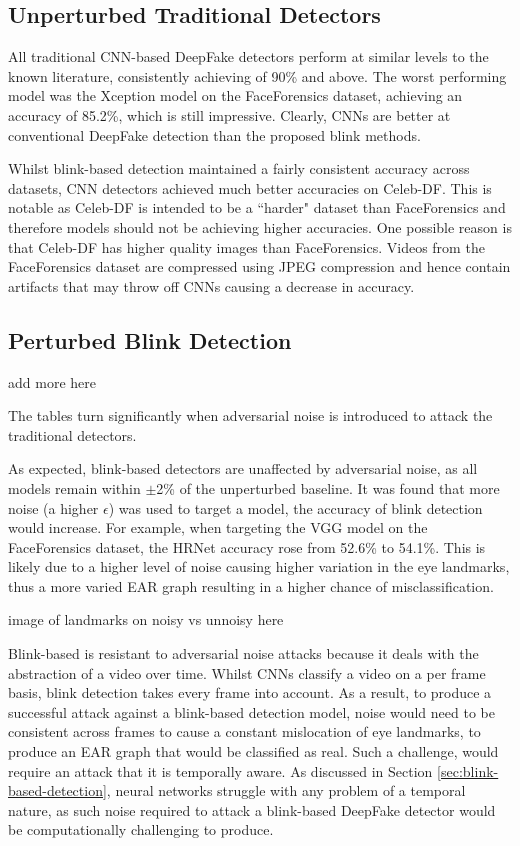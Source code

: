 \subsection{Unperturbed Traditional Detectors}
\label{sec:un-trad-detect}

All traditional CNN-based DeepFake detectors perform at similar levels to the known literature, consistently achieving of 90\% and above. The worst performing model was the Xception model on the FaceForensics dataset, achieving an accuracy of 85.2\%, which is still impressive. Clearly, CNNs are better at conventional DeepFake detection than the proposed blink methods. 

Whilst blink-based detection maintained a fairly consistent accuracy across datasets, CNN detectors achieved much better accuracies on Celeb-DF. This is notable as Celeb-DF is intended to be a ``harder" dataset than FaceForensics\cite{li2020celeb} and therefore models should not be achieving higher accuracies. One possible reason is that Celeb-DF has higher quality images than FaceForensics. Videos from the FaceForensics dataset are compressed using JPEG compression\cite{roessler2018faceforensics} and hence contain artifacts that may throw off CNNs causing a decrease in accuracy.

\subsection{Perturbed Blink Detection}
\label{sec:pert-blink}

{\huge add more here}

The tables turn significantly when adversarial noise is introduced to attack the traditional detectors. 

As expected, blink-based detectors are unaffected by adversarial noise, as all models remain within $\pm$2\% of the unperturbed baseline. It was found that more noise (a higher $\epsilon$) was used to target a model, the accuracy of blink detection would increase. For example, when targeting the VGG model on the FaceForensics dataset, the HRNet accuracy rose from 52.6\% to 54.1\%. This is likely due to a higher level of noise causing higher variation in the eye landmarks, thus a more varied EAR graph resulting in a higher chance of misclassification.

{\huge image of landmarks on noisy vs unnoisy here}

Blink-based is resistant to adversarial noise attacks because it deals with the abstraction of a video over time. Whilst CNNs classify a video on a per frame basis, blink detection takes every frame into account. As a result, to produce a successful attack against a blink-based detection model, noise would need to be consistent across frames to cause a constant mislocation of eye landmarks, to produce an EAR graph that would be classified as real. Such a challenge, would require an attack that it is temporally aware. As discussed in Section \ref{sec:blink-based-detection}, neural networks struggle with any problem of a temporal nature, as such noise required to attack a blink-based DeepFake detector would be computationally challenging to produce.

